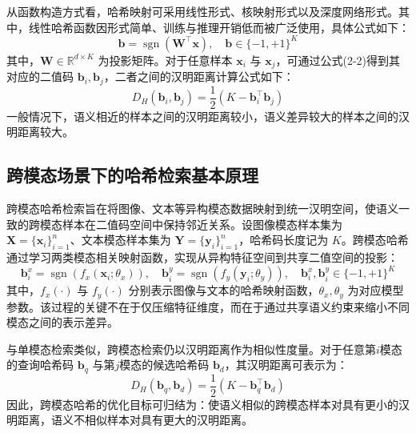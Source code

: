 从函数构造方式看，哈希映射可采用线性形式、核映射形式以及深度网络形式。其中，线性哈希函数因形式简单、训练与推理开销低而被广泛使用，具体公式如下：
\begin{equation}
  \mathbf{b}=\operatorname{sgn}(\mathbf{W}^{\top}\mathbf{x}), \quad \mathbf{b}\in\{-1,+1\}^{K}
\end{equation}
其中，$\mathbf{W}\in\mathbb{R}^{d\times K}$ 为投影矩阵。对于任意样本 $\mathbf{x}_i$ 与 $\mathbf{x}_j$，可通过公式(2-2)得到其对应的二值码 $\mathbf{b}_i,\mathbf{b}_j$，二者之间的汉明距离计算公式如下：
\begin{equation}
  D_H(\mathbf{b}_i,\mathbf{b}_j)=\frac{1}{2}\left(K-\mathbf{b}_i^{\top}\mathbf{b}_j\right)
\end{equation}
一般情况下，语义相近的样本之间的汉明距离较小，语义差异较大的样本之间的汉明距离较大。
\subsection{跨模态场景下的哈希检索基本原理}

跨模态哈希检索旨在将图像、文本等异构模态数据映射到统一汉明空间，使语义一致的跨模态样本在二值码空间中保持邻近关系。设图像模态样本集为 $\mathbf{X}=\{\mathbf{x}_i\}_{i=1}^{n}$、文本模态样本集为 $\mathbf{Y}=\{\mathbf{y}_i\}_{i=1}^{n}$，哈希码长度记为 $K$。跨模态哈希通过学习两类模态相关映射函数，实现从异构特征空间到共享二值空间的投影：
\begin{equation}
  \mathbf{b}_i^{x}=\operatorname{sgn}\!\left(f_x(\mathbf{x}_i;\theta_x)\right),\quad
  \mathbf{b}_i^{y}=\operatorname{sgn}\!\left(f_y(\mathbf{y}_i;\theta_y)\right),\quad
  \mathbf{b}_i^{x},\mathbf{b}_i^{y}\in\{-1,+1\}^{K}
\end{equation}
其中，$f_x(\cdot)$ 与 $f_y(\cdot)$ 分别表示图像与文本的哈希映射函数，$\theta_x,\theta_y$ 为对应模型参数。该过程的关键不在于仅压缩特征维度，而在于通过共享语义约束来缩小不同模态之间的表示差异。

与单模态检索类似，跨模态检索仍以汉明距离作为相似性度量。对于任意第$i$模态的查询哈希码 $\mathbf{b}_q$ 与第$j$模态的候选哈希码 $\mathbf{b}_d$，其汉明距离可表示为：
\begin{equation}
  D_H(\mathbf{b}_q,\mathbf{b}_d)=\frac{1}{2}\left(K-\mathbf{b}_q^{\top}\mathbf{b}_d\right)
\end{equation}
因此，跨模态哈希的优化目标可归结为：使语义相似的跨模态样本对具有更小的汉明距离，语义不相似样本对具有更大的汉明距离。

